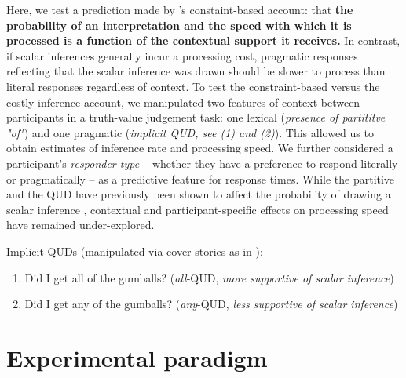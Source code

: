 \documentclass[10pt,letterpaper]{article}
\begin{document}
Here, we test a prediction made by 
's constaint-based account: that \textbf{the probability of an interpretation and the speed with which it is processed is a function of the contextual support it receives.} In contrast, if scalar inferences generally incur a processing cost, pragmatic responses reflecting that the scalar inference was drawn should be slower to process than literal responses regardless of context. To test the constraint-based versus the costly inference account, we manipulated two features of context between participants in a truth-value judgement task: one lexical (\textit{presence of partititve "of"}) and one pragmatic (\textit{implicit QUD, see (1) and (2)}). This allowed us to obtain estimates of inference rate and processing speed. We further considered a participant’s \textit{responder type  --} whether they have a preference to respond literally or pragmatically -- as a predictive feature for response times. While the partitive and the QUD have previously been shown to affect the probability of drawing a scalar inference \cite{Zondervan2010,Degen2015,DegenGoodman2014,DegenTanenhaus2015}, contextual and participant-specific effects on processing speed have remained under-explored.

Implicit QUDs (manipulated via cover stories as in ):
\begin{enumerate}
  \item Did I get all of the gumballs? (\textit{all}-QUD, \textit{more supportive of scalar inference})
  \item Did I get any of the gumballs? (\textit{any}-QUD, \textit{less supportive of scalar inference})
\end{enumerate} 

\section{Experimental paradigm}
\end{document}
